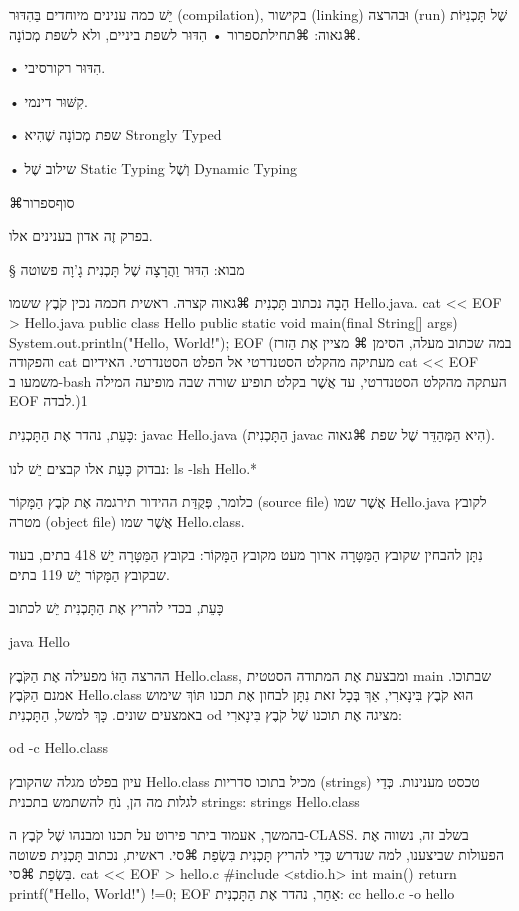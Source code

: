 יֵשׁ כמה ענינים מיוחדים בַּהִדּוּר (compilation), בקישור (linking) וּבהרצה (run)
שֶׁל תָּכְנִיּוֹת ⌘גאוה:
⌘תחילת{ספרור}
• הִדּוּר לשפת ביניים, ולא לשפת מְכוֹנָה.

• הִדּוּר רקורסיבי.

• קִשּׁוּר דינמי.

• שפת מְכוֹנָה שֶׁהִיא Strongly Typed

• שילוב שֶׁל Static Typing וְשֶׁל Dynamic Typing

⌘סוף{ספרור}

בפרק זֶה אדון בענינים אלו.

§ מבוא: הִדּוּר וַהֲרָצָה שֶׁל תָּכְנִית גָ'וָה פשוטה

הָבָה נכתוב תָּכְנִית ⌘גאוה קצרה. ראשית חכמה נכין קֹבֶץ ששמו Hello.java.
cat << EOF > Hello.java
public class Hello {
  public static void main(final String[] args) {
    System.out.println("Hello, World!\n");
  }
}
EOF
\END
(במה שכתוב מעלה, הסימן ⌘
מציין אֶת הַזרז והפקודה cat מעתיקה מהקלט הסטנדרטי
אל הפלט הסטנדרטי. האידיום cat << EOF משמעו ב-bash העתקה מהקלט הסטנדרטי, עד
אֲשֶׁר בקלט תופיע שורה שבה מופיעה המילה EOF לבדה.)1

כָּעֵת, נהדר אֶת הַתָּכְנִית:
javac Hello.java
\END
(הַתָּכְנִית javac הִיא הַמְּהַדֵּר שֶׁל שפת ⌘גאוה).

נבדוק כָּעֵת אלו קבצים יֵשׁ לנו:
ls -lsh Hello.*
\END

כלומר, פְּקֻדַּת ההידור תירגמה אֶת קֹבֶץ הַמָּקוֹר (source file) אֲשֶׁר שמו Hello.java
לקובץ מטרה (object file) אֲשֶׁר שמו Hello.class.

נִתָּן להבחין שקובץ הַמַּטָּרָה ארוך מעט מקובץ הַמָּקוֹר: בקובץ הַמַּטָּרָה יֵשׁ
418 בתים, בעוד שבקובץ הַמָּקוֹר יֵשׁ 119 בתים.

כָּעֵת, בכדי להריץ אֶת הַתָּכְנִית יֵשׁ לכתוב

java Hello
\END

ההרצה הַזּוֹ מפעילה אֶת הַקֹּבֶץ Hello.class, ומבצעת אֶת המתודה הסטטית main
שבתוכו.
אמנם הַקֹּבֶץ Hello.class הוּא קֹבֶץ בִּינָארִי, אַךְ בְּכָל זאת נִתָּן לבחון
אֶת תכנו תּוֹךְ שימוש באמצעים שונים. כָּךְ למשל, הַתָּכְנִית od מציגה אֶת תוכנו
שֶׁל קֹבֶץ בִּינָארִי:

od -c Hello.class
\END

עיון בפלט מגלה שהקובץ Hello.class מכיל בתוכו סדריות (strings) טכסט מענינות.
כְּדֵי לגלות מה הן, נֹחַ להשתמש בתכנית strings:
strings Hello.class
\END

בהמשך, אעמוד ביתר פירוט על תכנו ומבנהו שֶׁל קֹבֶץ ה-CLASS. בשלב זה, נשווה אֶת
הפעולות שביצענו, למה שנדרש כְּדֵי להריץ תָּכְנִית בִּשְׂפַת ⌘סי.
ראשית, נכתוב תָּכְנִית פשוטה בִּשְׂפַת ⌘סי.
cat << EOF > hello.c
#include <stdio.h>
int main() {
   return printf("Hello, World!\n") !=0;
}
EOF
\END
אַחַר, נהדר אֶת הַתָּכְנִית:
cc hello.c -o hello
\END


